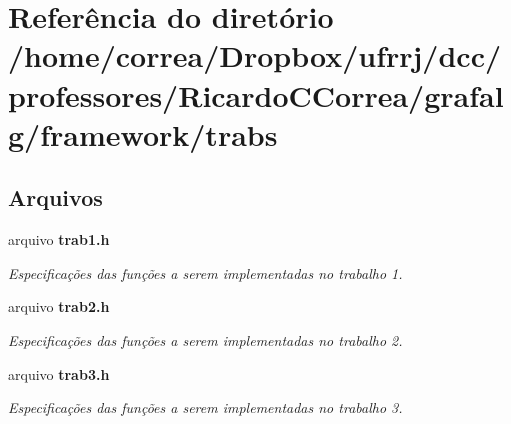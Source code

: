 \section{Referência do diretório /home/correa/\+Dropbox/ufrrj/dcc/professores/\+Ricardo\+C\+Correa/grafalg/framework/trabs}
\label{dir_7e96c9bb60ee65ac302ca9cdda90332a}
\subsection*{Arquivos}
\begin{DoxyCompactItemize}
\item 
arquivo {\bf trab1.\+h}
\begin{DoxyCompactList}\small\item\em Especificações das funções a serem implementadas no trabalho 1. \end{DoxyCompactList}\item 
arquivo {\bf trab2.\+h}
\begin{DoxyCompactList}\small\item\em Especificações das funções a serem implementadas no trabalho 2. \end{DoxyCompactList}\item 
arquivo {\bf trab3.\+h}
\begin{DoxyCompactList}\small\item\em Especificações das funções a serem implementadas no trabalho 3. \end{DoxyCompactList}\end{DoxyCompactItemize}
